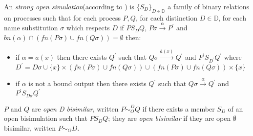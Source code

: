 \begin{definition}
  An \emph{strong open simulation}(according to \cite{parrow}) is $\{S_{D}\}_{D\in \mathbb{D}}$ a family of binary relations on processes such that for each process $P, Q$, for each distinction $D\in \mathbb{D}$, for each name substitution $\sigma$ which respects $D$ if $P S_{D} Q$, $P\sigma \xrightarrow{\alpha} P^{'}$ and $bn(\alpha)\cap (fn(P\sigma)\cup fn(Q\sigma))=\emptyset$ then:
   \begin{itemize}
    \item 
      if $\alpha=\overline{a}(x)$ then there exists $Q^{'}$ such that $Q\sigma \xrightarrow{\overline{a}(x)} Q^{'}$ and $P^{'} S_{D^{'}} Q^{'}$ where $D^{'}=D\sigma \cup \{x\}\times (fn(P\sigma)\cup fn(Q\sigma)) \cup  (fn(P\sigma)\cup fn(Q\sigma))\times\{x\}$
    \item
      if $\alpha$ is not a bound output then there exists $Q^{'}$ such that $Q\sigma \xrightarrow{\alpha} Q^{'}$ and $P^{'} S_{D\sigma} Q^{'}$
  \end{itemize}
  $P$ and $Q$ are \emph{open D bisimilar}, written $P \dot{\sim}_{O}^{D} Q$ if there exists a member $S_{D}$ of an open bisimulation such that $P S_{D} Q$; they are \emph{open bisimilar} if they are open $\emptyset$ bisimilar, written $P \dot{\sim}_{O} D$.
 

\end{definition}
 
 















